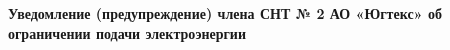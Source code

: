 \vspace{5mm}
\begin{center}
	\Large\textbf{Уведомление (предупреждение)
		члена СНТ № 2 АО «Югтекс» об ограничении подачи электроэнергии}
\end{center}
\par
\vspace{5mm}





